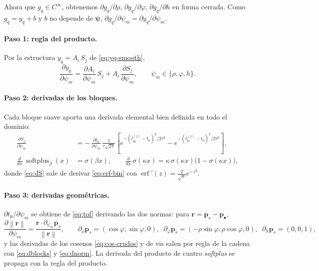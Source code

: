 \documentclass[11pt,a4paper]{article}
\theoremstyle{plain}
\theoremstyle{definition}
\newcommand{\vect}[1]{\boldsymbol{#1}}
\newcommand{\softplus}{\operatorname{softplus}}
\newcommand{\erf}{\operatorname{erf}}
\newcommand{\norm}[1]{\left\lVert #1 \right\rVert}
\begin{document}
Ahora que $g_q\in C^\infty$, obtenemos $\partial g_q/\partial\rho$,
$\partial g_q/\partial\varphi$, $\partial g_q/\partial h$ en forma cerrada. Como
$g_q=y_q+b$ y $b$ no depende de $\vect{\psi}$,
$\partial g_q/\partial\psi_m=\partial y_q/\partial\psi_m$.

\paragraph{Paso 1: regla del producto.} Por la estructura $y_q=A_i\,S_j$ de
\eqref{eq:yq-smooth},
\begin{equation}
    \frac{\partial y_q}{\partial\psi_m}
    =\frac{\partial A_i}{\partial\psi_m}\,S_j
    +A_i\,\frac{\partial S_j}{\partial\psi_m},
    \qquad \psi_m\in\{\rho,\varphi,h\}.
    \label{eq:chain}
\end{equation}

\paragraph{Paso 2: derivadas de los bloques.} Cada bloque suave aporta una
derivada elemental bien definida en todo el dominio:
\begin{align}
    \frac{\partial S_j}{\partial\psi_m}
    &=-\,\frac{\partial t_0}{\partial\psi_m}\,
    \frac{1}{\tau\sqrt{2\pi}}
    \left[
        e^{-(t^{(j)}_{\mathrm{hi}}-t_0)^2/2\tau^2}
        -e^{-(t^{(j)}_{\mathrm{lo}}-t_0)^2/2\tau^2}
    \right],
    \label{eq:dS}\\[4pt]
    \frac{d}{dx}\,\softplus_\beta(x)&=\sigma(\beta x),
    \qquad
    \frac{d}{dx}\,\sigma(\kappa x)=\kappa\,\sigma(\kappa x)\bigl(1-\sigma(\kappa x)\bigr),
    \label{eq:dblocks}
\end{align}
donde \eqref{eq:dS} sale de derivar \eqref{eq:erf-bin} con
$\erf'(z)=\tfrac{2}{\sqrt\pi}e^{-z^2}$.

\paragraph{Paso 3: derivadas geom\'etricas.} $\partial t_0/\partial\psi_m$ se
obtiene de \eqref{eq:tof} derivando las dos normas: para $\vect r=\vect p_s-\vect
p_\bullet$,
\begin{equation}
    \frac{\partial\norm{\vect r}}{\partial\psi_m}
    =\frac{\vect r\cdot\partial_{\psi_m}\vect p_s}{\norm{\vect r}},
    \qquad
    \partial_\rho\vect p_s=(\cos\varphi,\sin\varphi,0),\;\;
    \partial_\varphi\vect p_s=(-\rho\sin\varphi,\rho\cos\varphi,0),\;\;
    \partial_h\vect p_s=(0,0,1),
    \label{eq:dnorm}
\end{equation}
y las derivadas de los cosenos \eqref{eq:cos-crudos} y de $\mathrm{vis}$ salen por
regla de la cadena con \eqref{eq:dblocks} y \eqref{eq:dnorm}. La derivada del
producto de cuatro \emph{softplus} se propaga con la regla del producto.
\end{document}
